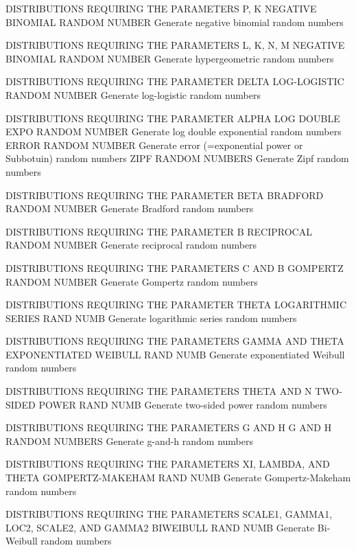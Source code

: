 DISTRIBUTIONS REQUIRING THE PARAMETERS P, K
   NEGATIVE BINOMIAL RANDOM NUMBER Generate negative binomial random
                                   numbers
 
DISTRIBUTIONS REQUIRING THE PARAMETERS L, K, N, M
   NEGATIVE BINOMIAL RANDOM NUMBER Generate hypergeometric random
                                   numbers

DISTRIBUTIONS REQUIRING THE PARAMETER DELTA
   LOG-LOGISTIC RANDOM NUMBER      Generate log-logistic random
                                   numbers

DISTRIBUTIONS REQUIRING THE PARAMETER ALPHA
   LOG DOUBLE EXPO RANDOM NUMBER   Generate log double exponential
                                   random numbers
   ERROR RANDOM NUMBER             Generate error (=exponential power
                                   or Subbotuin) random numbers
   ZIPF RANDOM NUMBERS             Generate Zipf random numbers

DISTRIBUTIONS REQUIRING THE PARAMETER BETA
   BRADFORD RANDOM NUMBER          Generate Bradford random numbers

DISTRIBUTIONS REQUIRING THE PARAMETER B
   RECIPROCAL RANDOM NUMBER        Generate reciprocal random numbers

DISTRIBUTIONS REQUIRING THE PARAMETERS C AND B
   GOMPERTZ RANDOM NUMBER          Generate Gompertz random numbers

DISTRIBUTIONS REQUIRING THE PARAMETER THETA
   LOGARITHMIC SERIES RAND NUMB    Generate logarithmic series random
                                   numbers

DISTRIBUTIONS REQUIRING THE PARAMETERS GAMMA AND THETA
   EXPONENTIATED WEIBULL RAND NUMB Generate exponentiated Weibull
                                   random numbers

DISTRIBUTIONS REQUIRING THE PARAMETERS THETA AND N
   TWO-SIDED POWER RAND NUMB       Generate two-sided power
                                   random numbers

DISTRIBUTIONS REQUIRING THE PARAMETERS G AND H
   G AND H RANDOM NUMBERS          Generate g-and-h random numbers

DISTRIBUTIONS REQUIRING THE PARAMETERS XI, LAMBDA, AND THETA
   GOMPERTZ-MAKEHAM RAND NUMB      Generate Gompertz-Makeham random
                                   numbers

DISTRIBUTIONS REQUIRING THE PARAMETERS SCALE1, GAMMA1, LOC2, SCALE2,
   AND GAMMA2
   BIWEIBULL RAND NUMB             Generate Bi-Weibull random numbers

